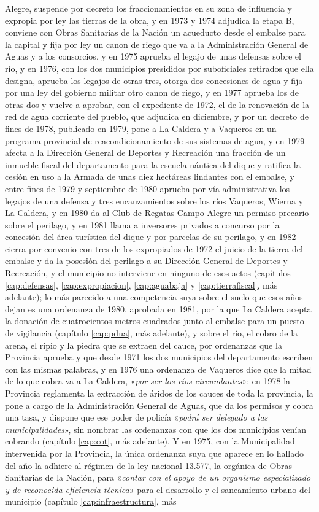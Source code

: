 Alegre, suspende por decreto los fraccionamientos en su zona de influencia y expropia por ley las tierras de la obra, y en 1973 y 1974 adjudica la etapa B, conviene con Obras Sanitarias de la Nación un acueducto desde el embalse para la capital y fija por ley un canon de riego que va a la Administración General de Aguas y a los consorcios, y en 1975 aprueba el legajo de unas defensas sobre el río, y en 1976, con los dos municipios presididos por suboficiales retirados que ella designa, aprueba los legajos de otras tres, otorga dos concesiones de agua y fija por una ley del gobierno militar otro canon de riego, y en 1977 aprueba los de otras dos y vuelve a aprobar, con el expediente de 1972, el de la renovación de la red de agua corriente del pueblo, que adjudica en diciembre, y por un decreto de fines de 1978, publicado en 1979, pone a La Caldera y a Vaqueros en un programa provincial de reacondicionamiento de sus sistemas de agua, y en 1979 afecta a la Dirección General de Deportes y Recreación una fracción de un inmueble fiscal del departamento para la escuela náutica del dique y ratifica la cesión en uso a la Armada de unas diez hectáreas lindantes con el embalse, y entre fines de 1979 y septiembre de 1980 aprueba por vía administrativa los legajos de una defensa y tres encauzamientos sobre los ríos Vaqueros, Wierna y La Caldera, y en 1980 da al Club de Regatas Campo Alegre un permiso precario sobre el perilago, y en 1981 llama a inversores privados a concurso por la concesión del área turística del dique y por parcelas de su perilago, y en 1982 cierra por convenio con tres de los expropiados de 1972 el juicio de la tierra del embalse y da la posesión del perilago a su Dirección General de Deportes y Recreación, y el municipio no interviene en ninguno de esos actos (capítulos \ref{cap:defensas}, \ref{cap:expropiacion}, \ref{cap:aguabaja} y \ref{cap:tierrafiscal}, más adelante); lo más parecido a una competencia suya sobre el suelo que esos años dejan es una ordenanza de 1980, aprobada en 1981, por la que La Caldera acepta la donación de cuatrocientos metros cuadrados junto al embalse para un puesto de vigilancia (capítulo \ref{cap:pdua}, más adelante), y sobre el río, el cobro de la arena, el ripio y la piedra que se extraen del cauce, por ordenanzas que la Provincia aprueba y que desde 1971 los dos municipios del departamento escriben con las mismas palabras, y en 1976 una ordenanza de Vaqueros dice que la mitad de lo que cobra va a La Caldera, «\textit{por ser los ríos circundantes}»; en 1978 la Provincia reglamenta la extracción de áridos de los cauces de toda la provincia, la pone a cargo de la Administración General de Aguas, que da los permisos y cobra una tasa, y dispone que ese poder de policía «\textit{podrá ser delegado a las municipalidades}», sin nombrar las ordenanzas con que los dos municipios venían cobrando (capítulo \ref{cap:cot}, más adelante). Y en 1975, con la Municipalidad intervenida por la Provincia, la única ordenanza suya que aparece en lo hallado del año la adhiere al régimen de la ley nacional 13.577, la orgánica de Obras Sanitarias de la Nación, para «\textit{contar con el apoyo de un organismo especializado y de reconocida eficiencia técnica}» para el desarrollo y el saneamiento urbano del municipio (capítulo \ref{cap:infraestructura}, más 